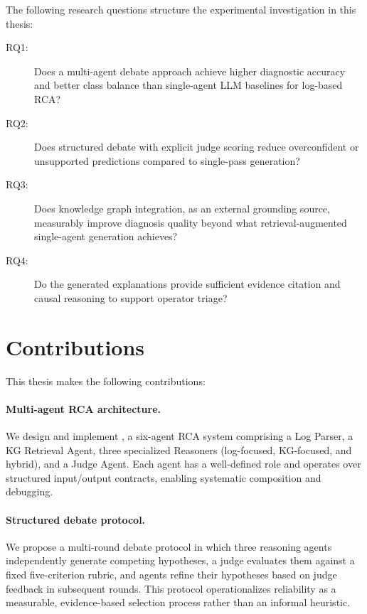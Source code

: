 The following research questions structure the experimental investigation in this thesis:

\begin{description}
  \item[RQ1:] Does a multi-agent debate approach achieve higher diagnostic accuracy and better
              class balance than single-agent LLM baselines for log-based RCA?
  \item[RQ2:] Does structured debate with explicit judge scoring reduce overconfident or
              unsupported predictions compared to single-pass generation?
  \item[RQ3:] Does knowledge graph integration, as an external grounding source, measurably
              improve diagnosis quality beyond what retrieval-augmented single-agent generation
              achieves?
  \item[RQ4:] Do the generated explanations provide sufficient evidence citation and causal
              reasoning to support operator triage?
\end{description}

\section{Contributions}

This thesis makes the following contributions:

\paragraph{Multi-agent RCA architecture.}
We design and implement \systemname{}, a six-agent RCA system comprising a Log Parser, a KG
Retrieval Agent, three specialized Reasoners (log-focused, KG-focused, and hybrid), and a Judge
Agent. Each agent has a well-defined role and operates over structured input/output contracts,
enabling systematic composition and debugging.

\paragraph{Structured debate protocol.}
We propose a multi-round debate protocol in which three reasoning agents independently generate
competing hypotheses, a judge evaluates them against a fixed five-criterion rubric, and agents
refine their hypotheses based on judge feedback in subsequent rounds. This protocol operationalizes
reliability as a measurable, evidence-based selection process rather than an informal heuristic.

